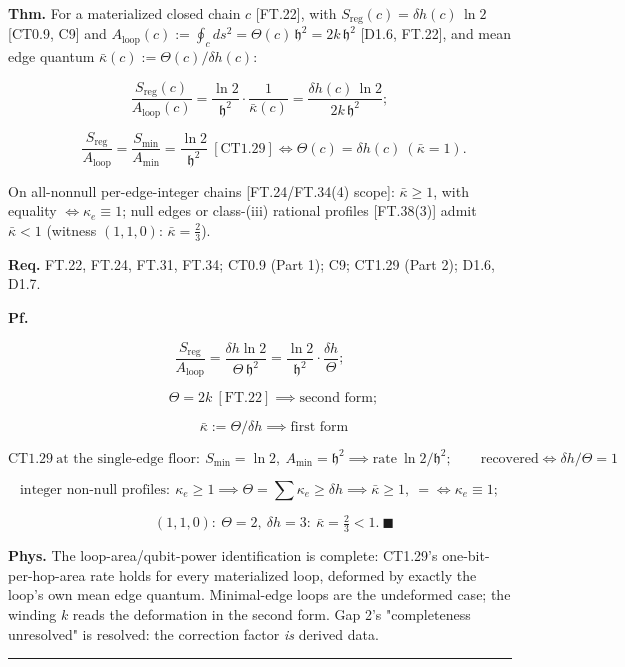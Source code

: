 \begin{theorem}\label{tag:FT-37}
\textbf{Thm.} For a materialized closed chain $c$ [FT.22], with $S_{\mathrm{reg}}(c)=\delta h(c)\,\ln2$ [CT0.9, C9] and $A_{\mathrm{loop}}(c):=\oint_c ds^2=\Theta(c)\,\mathfrak h^2=2k\,\mathfrak h^2$ [D1.6, FT.22], and mean edge quantum $\bar\kappa(c):=\Theta(c)/\delta h(c)$:

\[
\frac{S_{\mathrm{reg}}(c)}{A_{\mathrm{loop}}(c)}=\frac{\ln2}{\mathfrak h^2}\cdot\frac{1}{\bar\kappa(c)}=\frac{\delta h(c)\,\ln2}{2k\,\mathfrak h^2};
\]

\[
\qquad \frac{S_{\mathrm{reg}}}{A_{\mathrm{loop}}}=\frac{S_{\min}}{A_{\min}}=\frac{\ln2}{\mathfrak h^2}\ [\mathrm{CT1.29}]\iff\Theta(c)=\delta h(c)\ (\bar\kappa=1).
\]

On all-nonnull per-edge-integer chains [FT.24/FT.34(4) scope]: $\bar\kappa\ge1$, with equality $\iff\kappa_e\equiv1$; null edges or class-(iii) rational profiles [FT.38(3)] admit $\bar\kappa<1$ (witness $(1,1,0)$: $\bar\kappa=\tfrac23$).

\textbf{Req.} FT.22, FT.24, FT.31, FT.34; CT0.9 (Part 1); C9; CT1.29 (Part 2); D1.6, D1.7.

\textbf{Pf.}

\[
\frac{S_{\mathrm{reg}}}{A_{\mathrm{loop}}}=\frac{\delta h\ln2}{\Theta\,\mathfrak h^2}=\frac{\ln2}{\mathfrak h^2}\cdot\frac{\delta h}{\Theta};
\]

\[
\qquad \Theta=2k\ [\mathrm{FT.22}]\implies\text{second form};
\]

\[
\qquad \bar\kappa:=\Theta/\delta h\implies\text{first form}
\]

\[
\mathrm{CT1.29}\ \text{at the single-edge floor}:\ S_{\min}=\ln2,\ A_{\min}=\mathfrak h^2\implies\text{rate}\ \ln2/\mathfrak h^2;\qquad\text{recovered}\iff\delta h/\Theta=1
\]

\[
\text{integer non-null profiles}:\ \kappa_e\ge1\implies\Theta=\sum\kappa_e\ge\delta h\implies\bar\kappa\ge1,\ =\iff\kappa_e\equiv1;
\]

\[
\qquad (1,1,0):\ \Theta=2,\ \delta h=3:\ \bar\kappa=\tfrac23<1.\ \blacksquare
\]

\textbf{Phys.} The loop-area/qubit-power identification is complete: CT1.29's one-bit-per-hop-area rate holds for every materialized loop, deformed by exactly the loop's own mean edge quantum. Minimal-edge loops are the undeformed case; the winding $k$ reads the deformation in the second form. Gap 2's "completeness unresolved" is resolved: the correction factor \textit{is} derived data.

\vspace{2pt}\noindent\rule{\textwidth}{0.4pt}\vspace{2pt}

\end{theorem}

